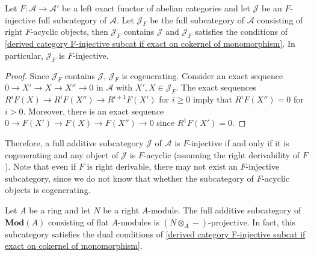 \begin{corollary}\label{derived category F-acyclic subcat is F-injective if}
Let $F:\mathcal{A}\to\mathcal{A}'$ be a left exact functor of abelian categories and let $\mathcal{J}$ be an $F$-injective full subcategory of $\mathcal{A}$. Let $\mathcal{J}_F$ be the full subcategory of $\mathcal{A}$ consisting of right $F$-acyclic objects, then $\mathcal{J}_F$ contains $\mathcal{J}$ and $\mathcal{J}_F$ satisfies the conditions of \cref{derived category F-injective subcat if exact on cokernel of monomorphism}. In particular, $\mathcal{J}_F$ is $F$-injective.
\end{corollary}
\begin{proof}
Since $\mathcal{J}_F$ contains $\mathcal{J}$, $\mathcal{J}_F$ is cogenerating. Consider an exact sequence $0\to X'\to X\to X''\to 0$ in $\mathcal{A}$ with $X',X\in\mathcal{J}_F$. The exact sequences $R^iF(X)\to R^iF(X'')\to R^{i+1}F(X')$ for $i\geq 0$ imply that $R^iF(X'')=0$ for $i>0$. Moreover, there is an exact sequence $0\to F(X')\to F(X)\to F(X'')\to 0$ since $R^1F(X')=0$.
\end{proof}
Therefore, a full additive subcategory $\mathcal{J}$ of $\mathcal{A}$ is $F$-injective if and only if it is cogenerating and any object of $\mathcal{J}$ is $F$-acyclic (assuming the right derivability of $F$). Note that even if $F$ is right derivable, there may not exist an $F$-injective subcategory, since we do not know that whether the subcategory of $F$-acyclic objects is cogenerating.
\begin{example}
Let $A$ be a ring and let $N$ be a right $A$-module. The full additive subcategory of $\mathbf{Mod}(A)$ consisting of flat $A$-modules is $(N\otimes_A-)$-projective. In fact, this subcategory satisfies the dual conditions of \cref{derived category F-injective subcat if exact on cokernel of monomorphism}.
\end{example}

